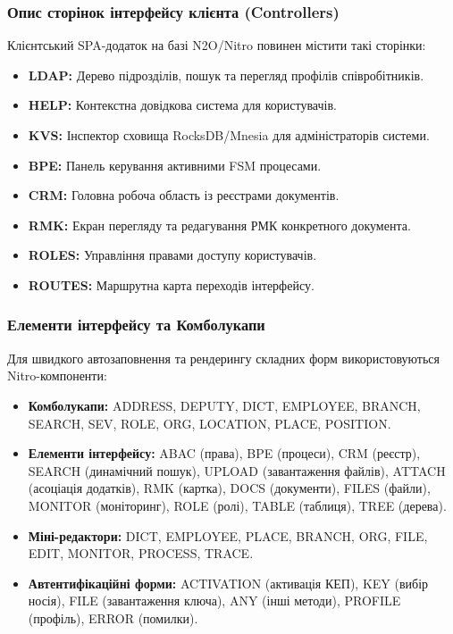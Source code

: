 \documentclass{article}
\begin{document}
\subsubsection{Опис сторінок інтерфейсу клієнта (Controllers)}
Клієнтський SPA-додаток на базі N2O/Nitro повинен містити такі сторінки:
\begin{itemize}
    \item \textbf{LDAP:} Дерево підрозділів, пошук та перегляд профілів співробітників.
    \item \textbf{HELP:} Контекстна довідкова система для користувачів.
    \item \textbf{KVS:} Інспектор сховища RocksDB/Mnesia для адміністраторів системи.
    \item \textbf{BPE:} Панель керування активними FSM процесами.
    \item \textbf{CRM:} Головна робоча область із реєстрами документів.
    \item \textbf{RMK:} Екран перегляду та редагування РМК конкретного документа.
    \item \textbf{ROLES:} Управління правами доступу користувачів.
    \item \textbf{ROUTES:} Маршрутна карта переходів інтерфейсу.
\end{itemize}

\subsubsection{Елементи інтерфейсу та Комболукапи}
Для швидкого автозаповнення та рендерингу складних форм використовуються Nitro-компоненти:
\begin{itemize}
    \item \textbf{Комболукапи:} ADDRESS, DEPUTY, DICT, EMPLOYEE, BRANCH, SEARCH, SEV, ROLE, ORG, LOCATION, PLACE, POSITION.
    \item \textbf{Елементи інтерфейсу:} ABAC (права), BPE (процеси), CRM (реєстр), SEARCH (динамічний пошук), UPLOAD (завантаження файлів), ATTACH (асоціація додатків), RMK (картка), DOCS (документи), FILES (файли), MONITOR (моніторинг), ROLE (ролі), TABLE (таблиця), TREE (дерева).
    \item \textbf{Міні-редактори:} DICT, EMPLOYEE, PLACE, BRANCH, ORG, FILE, EDIT, MONITOR, PROCESS, TRACE.
    \item \textbf{Автентифікаційні форми:} ACTIVATION (активація КЕП), KEY (вибір носія), FILE (завантаження ключа), ANY (інші методи), PROFILE (профіль), ERROR (помилки).
\end{itemize}
\end{document}
